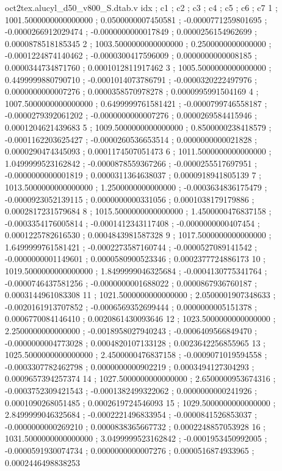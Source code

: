 \begin{filecontents}[overwrite]{oct2tex.alucyl_d50_v800_S.dtab.v}
idx ; c1 ; c2 ; c3 ; c4 ; c5 ; c6 ; c7
1 ; 1001.5000000000000000 ; 0.0500000007450581 ; -0.0000771259801695 ; -0.0000266912029474 ; -0.0000000000017849 ; 0.0000256154962699 ; 0.0000878518185345
2 ; 1003.5000000000000000 ; 0.2500000000000000 ; -0.0001224874140462 ; -0.0000300417596009 ; 0.0000000000008185 ; 0.0000344734871760 ; 0.0001012811917462
3 ; 1005.5000000000000000 ; 0.4499999880790710 ; -0.0001014073786791 ; -0.0000320222497976 ; 0.0000000000007276 ; 0.0000358570978278 ; 0.0000995991504169
4 ; 1007.5000000000000000 ; 0.6499999761581421 ; -0.0000799746558187 ; -0.0000279392061202 ; -0.0000000000007276 ; 0.0000269584415946 ; 0.0001204621439683
5 ; 1009.5000000000000000 ; 0.8500000238418579 ; -0.0001162203625427 ; -0.0000260536653514 ; 0.0000000000021828 ; 0.0000290474345093 ; 0.0001174507051473
6 ; 1011.5000000000000000 ; 1.0499999523162842 ; -0.0000878559367266 ; -0.0000255517697951 ; -0.0000000000001819 ; 0.0000311364638037 ; 0.0000918941805139
7 ; 1013.5000000000000000 ; 1.2500000000000000 ; -0.0003634836175479 ; -0.0000923052139115 ; 0.0000000000331056 ; 0.0001038179179886 ; 0.0002817231579684
8 ; 1015.5000000000000000 ; 1.4500000476837158 ; -0.0003354176005814 ; -0.0001412343117408 ; -0.0000000000407454 ; 0.0001225782616530 ; 0.0004843981587328
9 ; 1017.5000000000000000 ; 1.6499999761581421 ; -0.0002273587160744 ; -0.0000527089141542 ; -0.0000000001149601 ; 0.0000580900523346 ; 0.0002377724886173
10 ; 1019.5000000000000000 ; 1.8499999046325684 ; -0.0004130775341764 ; -0.0000746437581256 ; -0.0000000001688022 ; 0.0000867936760187 ; 0.0003144961083308
11 ; 1021.5000000000000000 ; 2.0500001907348633 ; -0.0020161913707852 ; -0.0006569352699444 ; 0.0000000005151378 ; 0.0006770084146410 ; 0.0020861430093646
12 ; 1023.5000000000000000 ; 2.2500000000000000 ; -0.0018958027940243 ; -0.0006409566849470 ; -0.0000000004773028 ; 0.0004820107133128 ; 0.0023642256855965
13 ; 1025.5000000000000000 ; 2.4500000476837158 ; -0.0009071019594558 ; -0.0003307782462798 ; 0.0000000000902219 ; 0.0003494127304293 ; 0.0009657394257374
14 ; 1027.5000000000000000 ; 2.6500000953674316 ; -0.0003752309421543 ; -0.0001382499322062 ; 0.0000000000241926 ; 0.0001090268051485 ; 0.0002619724546093
15 ; 1029.5000000000000000 ; 2.8499999046325684 ; -0.0002221496833954 ; -0.0000841526853037 ; -0.0000000000269210 ; 0.0000838365667732 ; 0.0002248857053928
16 ; 1031.5000000000000000 ; 3.0499999523162842 ; -0.0001953450992005 ; -0.0000591930074734 ; 0.0000000000007276 ; 0.0000516874933965 ; 0.0002446498838253

\end{filecontents}
